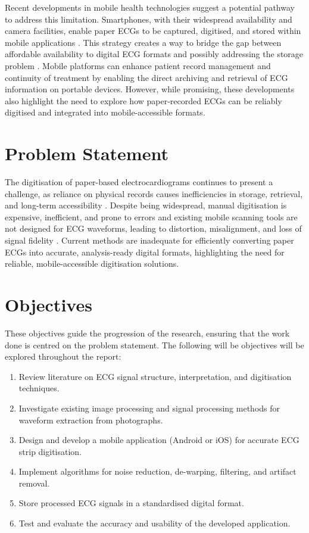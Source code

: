 Recent developments in mobile health technologies suggest a potential pathway to address this limitation. Smartphones, with their widespread availability and camera facilities, enable paper ECGs to be captured, digitised, and stored within mobile applications \cite{MartinezPerez2013MobileAppsCardiology}\cite{Wu2022FullyAutomatedECGDigitisation}. This strategy creates a way to bridge the gap between affordable availability to digital ECG formats and possibly addressing the storage problem \cite{Liu2020MobileCloudECGExtraction}. Mobile platforms can enhance patient record management and continuity of treatment by enabling the direct archiving and retrieval of ECG information on portable devices. However, while promising, these developments also highlight the need to explore how paper-recorded ECGs can be reliably digitised and integrated into mobile-accessible formats.


\section{Problem Statement}

The digitisation of paper-based electrocardiograms continues to present a challenge, as reliance on physical records causes inefficiencies in storage, retrieval, and long-term accessibility \cite{MartinezPerez2013MobileAppsCardiology,Steinhubl2013CanMHealth}. Despite being widespread, manual digitisation is expensive, inefficient, and prone to errors \cite{Eapen2016MobileHealthCardioEHR} and existing mobile scanning tools are not designed for ECG waveforms, leading to distortion, misalignment, and loss of signal fidelity \cite{McConnell2018CardioMHealthReview}. Current methods are inadequate for efficiently converting paper ECGs into accurate, analysis-ready digital formats, highlighting the need for reliable, mobile-accessible digitisation solutions.


\section{Objectives}
These objectives guide the progression of the research, ensuring that the work done is centred on the problem statement. The following will be objectives will be explored throughout the report: 
\begin{enumerate}
    \item Review literature on ECG signal structure, interpretation, and digitisation techniques.
    \item Investigate existing image processing and signal processing methods for waveform extraction from photographs.
    \item Design and develop a mobile application (Android or iOS) for accurate ECG strip digitisation.
    \item Implement algorithms for noise reduction, de-warping, filtering, and artifact removal.
    \item Store processed ECG signals in a standardised digital format.
    \item Test and evaluate the accuracy and usability of the developed application.
\end{enumerate}

